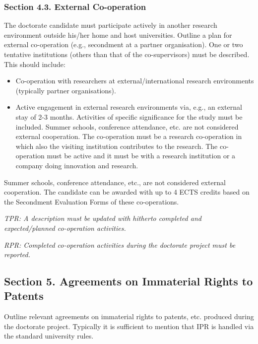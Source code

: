 \documentclass[12pt]{article}
\begin{document}
\subsubsection*{Section 4.3. External Co-operation}

The doctorate candidate must participate actively in another research environment outside his/her home and host universities.
Outline a plan for external co-operation (e.g., secondment at a partner organisation).
One or two tentative institutions (others than that of the co-supervisors) must be described. \\
This should include:
\begin{itemize}
\item Co-operation with researchers at external/international research environments (typically partner organisations).
\item Active engagement in external research environments via, e.g., an external stay of 2-3 months.
Activities of specific significance for the study must be included. Summer schools, conference attendance, etc. are not considered external cooperation. The co-operation must be a research co-operation in which also the visiting institution contributes to the research. The co-operation must be active and it must be with a research institution or a company doing innovation and research.
\end{itemize}

Summer schools, conference attendance, etc., are not considered external cooperation.
The candidate can be awarded with up to 4 ECTS credits based on the Secondment Evaluation Forms of these co-operations.

\begin{shaded}
\noindent
\emph{TPR: A description must be updated with hitherto completed and expected/planned co-operation activities.}

\noindent
\emph{RPR: Completed co-operation activities during the doctorate project must be reported.}
\end{shaded}

\subsection*{Section 5. Agreements on Immaterial Rights to Patents}

Outline relevant agreements on immaterial rights to patents, etc. produced during the doctorate project. Typically it is sufficient to mention that IPR is handled via the standard university rules.
\end{document}
